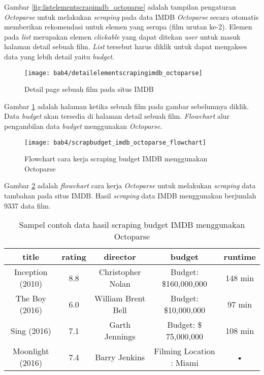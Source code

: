 Gambar \ref{fig:listelementscrapimdb_octoparse} adalah tampilan pengaturan \textit{Octoparse} untuk melakukan \textit{scraping} pada data IMDB \textit{Octoparse} secara otomatis memberikan rekomendasi untuk elemen yang serupa (film urutan ke-2). Elemen pada \textit{list} merupakan elemen \textit{clickable} yang dapat ditekan \textit{user} untuk masuk halaman  detail sebuah film. \textit{List} tersebut harus diklik untuk dapat mengakses data yang lebih detail yaitu \textit{budget}.

\begin{figure}[H]
	\centering  
	\texttt{[image: bab4/detailelementscrapingimdb\_octoparse]}   
	\caption{Detail page sebuah film pada situs IMDB}
	\label{fig:detailelementscrapingimdb_octoparse} 
\end{figure} 

Gambar \ref{fig:detailelementscrapingimdb_octoparse} adalah halaman ketika sebuah film pada gambar sebelumnya diklik. Data \textit{budget} akan tersedia di halaman detail sebuah film. \textit{Flowchart} alur pengambilan data \textit{budget} menggunakan \textit{Octoparse}.

\begin{figure}[H]
	\centering  
	\texttt{[image: bab4/scrapbudget\_imdb\_octoparse\_flowchart]}   
	\caption{Flowchart cara kerja scraping budget IMDB menggunakan Octoparse}
	\label{fig:scrapbudget_imdb_octoparse_flowchart} 
\end{figure} 

Gambar \ref{fig:scrapbudget_imdb_octoparse_flowchart} adalah \textit{flowchart} cara kerja \textit{Octoparse} untuk melakukan \textit{scraping} data tambahan pada situs IMDB. Hasil \textit{scraping} data IMDB menggunakan berjumlah 9337 data film.


\begin{table}
\caption{Sampel contoh data hasil scraping budget IMDB menggunakan Octoparse}
\centering
\begin{tabular}{|c|c|c|c|c|}
\hline 
title & rating & director & budget & runtime \\ 
\hline 
Inception (2010) & 8.8 & Christopher Nolan & Budget: \$160,000,000 & 148 min \\ 
\hline 
The Boy (2016) & 6.0 & William Brent Bell & Budget: \$10,000,000 & 97 min \\ 
\hline 
Sing (2016) & 7.1 & Garth Jennings & Budget: \$ 75,000,000 & 108 min \\ 
\hline 
Moonlight (2016) & 7.4 & Barry Jenkins & Filming Location : Miami & • \\ 
\hline 
\end{tabular} 
\label{tab:hasilscraping_budget_imdb}
\end{table}



